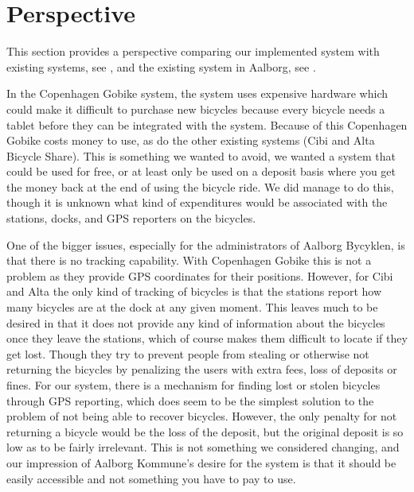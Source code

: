 \section{Perspective}
This section provides a perspective comparing our implemented system with existing systems, see , and the existing system in Aalborg, see .

In the Copenhagen Gobike system, the system uses expensive hardware which could make it difficult to purchase new bicycles because every bicycle needs a tablet before they can be integrated with the system.
Because of this Copenhagen Gobike costs money to use, as do the other existing systems (Cibi and Alta Bicycle Share). 
This is something we wanted to avoid, we wanted a system that could be used for free, or at least only be used on a deposit basis where you get the money back at the end of using the bicycle ride. 
We did manage to do this, though it is unknown what kind of expenditures would be associated with the stations, docks, and GPS reporters on the bicycles. 

One of the bigger issues, especially for the administrators of Aalborg Bycyklen, is that there is no tracking capability. 
With Copenhagen Gobike this is not a problem as they provide GPS coordinates for their positions.
However, for Cibi and Alta the only kind of tracking of bicycles is that the stations report how many bicycles are at the dock at any given moment.
This leaves much to be desired in that it does not provide any kind of information about the bicycles once they leave the stations, which of course makes them difficult to locate if they get lost.
Though they try to prevent people from stealing or otherwise not returning the bicycles by penalizing the users with extra fees, loss of deposits or fines.
For our system, there is a mechanism for finding lost or stolen bicycles through GPS reporting, which does seem to be the simplest solution to the problem of not being able to recover bicycles.
However, the only penalty for not returning a bicycle would be the loss of the deposit, but the original deposit is so low as to be fairly irrelevant.
This is not something we considered changing, and our impression of Aalborg Kommune's desire for the system is that it should be easily accessible and not something you have to pay to use.

